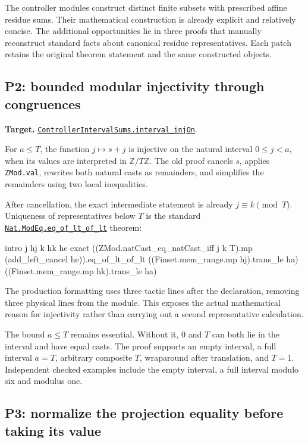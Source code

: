 \documentclass[11pt]{article}
\newcommand{\code}[1]{\nolinkurl{#1}}
\newcommand{\repo}[2]{\href{https://github.com/VladimirReshetnikov/ProveIt/blob/7df43cdfacb490cd3ca3acd23e39027efebf8801/Computability/DiophantineConsistency/#1}{#2}}
\newcommand{\ml}[2]{\href{https://github.com/leanprover-community/mathlib4/blob/81a5d257c8e410db227a6665ed08f64fea08e997/Mathlib/#1}{#2}}
\begin{document}
The controller modules construct distinct finite subsets with prescribed affine residue sums. Their mathematical construction is already explicit and relatively concise. The additional opportunities lie in three proofs that manually reconstruct standard facts about canonical residue representatives. Each patch retains the original theorem statement and the same constructed objects.

\subsection{P2: bounded modular injectivity through congruences}

\textbf{Target.} \repo{Lean/DiophantineConsistency/ControllerIntervalSums.lean}{\code{ControllerIntervalSums.interval_injOn}}.

For $a\le T$, the function $j\mapsto s+j$ is injective on the natural interval $0\le j<a$, when its values are interpreted in $\mathbb Z/T\mathbb Z$. The old proof cancels $s$, applies \code{ZMod.val}, rewrites both natural casts as remainders, and simplifies the remainders using two local inequalities.

After cancellation, the exact intermediate statement is already $j\equiv k\pmod T$. Uniqueness of representatives below $T$ is the standard \ml{Data/Nat/ModEq.lean}{\code{Nat.ModEq.eq_of_lt_of_lt}} theorem:

\begin{Lean}
  intro j hj k hk he
  exact ((ZMod.natCast_eq_natCast_iff j k T).mp
    (add_left_cancel he)).eq_of_lt_of_lt
    ((Finset.mem_range.mp hj).trans_le ha)
    ((Finset.mem_range.mp hk).trans_le ha)
\end{Lean}

The production formatting uses three tactic lines after the declaration, removing three physical lines from the module. This exposes the actual mathematical reason for injectivity rather than carrying out a second representative calculation.

The bound $a\le T$ remains essential. Without it, $0$ and $T$ can both lie in the interval and have equal casts. The proof supports an empty interval, a full interval $a=T$, arbitrary composite $T$, wraparound after translation, and $T=1$. Independent checked examples include the empty interval, a full interval modulo six and modulus one.

\subsection{P3: normalize the projection equality before taking its value}
\end{document}
